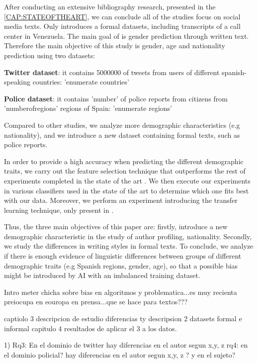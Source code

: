 After conducting an extensive bibliography research, presented in the \ref{CAP:STATEOFTHEART}, we can conclude all of the studies focus on social media texts. Only \cite{escobar2021gender} introduces a formal datasets, including transcripts of a call center in Venezuela. The main goal of \cite{escobar2021gender} is gender prediction through written text. Therefore the main objective of this study is gender, age and nationality prediction using two datasets: 

\textbf{Twitter dataset}: it contains 5000000 of tweets from users of different spanish-speaking countries: 'enumerate countries'

\textbf{Police dataset}: it contains 'number' of police reports from citizens from 'numberofregions' regions of Spain: 'enumerate regions'

Compared to other studies, we analyze more demographic characteristics (e.g nationality), and we introduce a new dataset containing formal texts, such as police reports. 

In order to provide a high accuracy when predicting the different demographic traits, we carry out the feature selection technique that outperforms the rest of experiments completed in the state of the art \cite{radha2022feature}. We then execute our experiments in various classifiers used in the state of the art to determine which one fits best with our data. Moreover, we perform an experiment introducing the transfer learning technique, only present in \cite{escobar2021gender}. 

Thus, the three main objectives of this paper are: firstly, introduce a new demographic characteristic in the study of author profiling, nationality. Secondly, we study the differences in writing styles in formal texts. To conclude, we analyze if there is enough evidence of linguistic differences between groups of different demographic traits (e.g Spanish regions, gender, age), so that a possible bias might be introduced by AI with an imbalanced training dataset.

Intro meter chicha sobre bias en algoritmos y problematica...es muy recienta preiocupa en eouropa en prensa...que se hace para textos???

 captiolo 3 descripcion de estudio diferencias ty descripsion 2 datasets formal e informal
 capitulo 4 resultados de aplicar el 3 a los datos.

1) Rq3: En el dominio de twitter hay diferencias en el autor segun x,y, z
rq4: en el dominio policial? hay diferencias en el autor segun x,y, z ? y en el sujeto?

